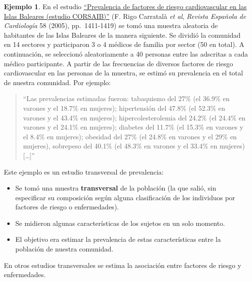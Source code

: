 \documentclass[
]{book}
\theoremstyle{definition}
\theoremstyle{definition}
\newtheorem{example}{Ejemplo}[chapter]
\theoremstyle{definition}
\theoremstyle{definition}
\theoremstyle{remark}
\begin{document}
\begin{example}
\protect\hypertarget{exm:corsaib}{}\label{exm:corsaib}En el estudio \href{https://www.revespcardiol.org/es-prevalencia-factores-riesgo-cardiovascular-islas-articulo-13082539}{``Prevalencia de factores de riesgo cardiovascular en las Islas Baleares (estudio CORSAIB)''} (F. Rigo Carratalà \emph{et al}, \emph{Revista Española de Cardiología} 58 (2005), pp.~1411-1419) se tomó una muestra aleatoria de habitantes de las Islas Baleares de la manera siguiente. Se dividió la comunidad en 14 sectores y participaron 3 o 4 médicos de familia por sector (50 en total). A continuación, se seleccionó aleatoriamente a 40 personas entre las adscritas a cada médico participante. A partir de las frecuencias de diversos factores de riesgo cardiovascular en las personas de la muestra, se estimó su prevalencia en el total de nuestra comunidad. Por ejemplo:
\end{example}

\begin{quote}
``Las prevalencias estimadas fueron: tabaquismo del 27\% (el 36.9\% en varones y el 18.7\% en mujeres); hipertensión del 47.8\% (el 52.3\% en varones y el 43.4\% en mujeres); hipercolesterolemia del 24.2\% (el 24.4\% en varones y el 24.1\% en mujeres); diabetes del 11.7\% (el 15.3\% en varones y el 8.4\% en mujeres); obesidad del 27\% (el 24.8\% en varones y el 29\% en mujeres), sobrepeso del 40.1\% (el 48.3\% en varones y el 33.4\% en mujeres) {[}\ldots{]}''
\end{quote}

Este ejemplo es un estudio transversal de prevalencia:

\begin{itemize}
\item
  Se tomó una muestra \textbf{transversal} de la población (la que salió, sin especificar su composición según alguna clasificación de los individuos por factores de riesgo o enfermedades).
\item
  Se midieron algunas características de los sujetos en un solo momento.
\item
  El objetivo era estimar la prevalencia de estas características entre la población de nuestra comunidad.
\end{itemize}

En otros estudios transversales se estima la asociación entre factores de riesgo y enfermedades.
\end{document}
